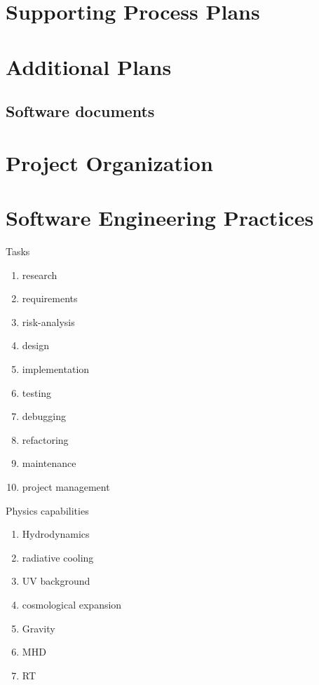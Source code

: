 \documentclass{article}[12pt]
\begin{document}
\section{Supporting Process Plans} \label{s:supporting}
\section{Additional Plans} \label{s:Additional Plans}



\subsection{Software documents}


\section{Project Organization} \label{s:intro}

\section{Software Engineering Practices}


Tasks

\begin{enumerate}
\item research
\item requirements
\item risk-analysis
\item design
\item implementation
\item testing
\item debugging
\item refactoring
\item maintenance
\item project management
\end{enumerate}

Physics capabilities

\begin{enumerate}
\item Hydrodynamics
\item radiative cooling
\item UV background
\item cosmological expansion
\item Gravity
\item MHD
\item RT
\end{enumerate}
\end{document}
